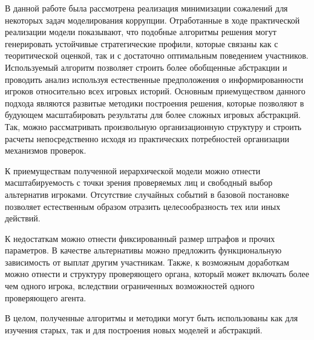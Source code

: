 \Conclusion %
\par
В данной работе была рассмотрена реализация минимизации сожалений для некоторых задач моделирования коррупции. Отработанные в ходе практической реализации модели показывают, что подобные алгоритмы решения могут генерировать устойчивые стратегические профили, которые связаны как с теоритической оценкой, так и с достаточно оптимальным поведением участников. Используемый алгоритм позволяет строить более обобщенные абстракции и проводить анализ используя естественные предположения о информированности игроков относительно всех игровых историй. Основным приемуществом данного подхода являются развитые методики построения решения, которые позволяют в будующем масштабировать результаты для более сложных игровых абстракций. Так, можно	рассматривать произвольную организационную структуру и строить расчеты непосредственно исходя из практических потребностей организации механизмов проверок.
\par
К приемуществам полученной иерархической модели можно отнести масштабируемость с точки зрения проверяемых лиц и свободный выбор альтернатив игроками. Отсутствие случайных событий в базовой постановке позволяет естественным образом отразить целесообразность тех или иных действий. 
\par
К недостаткам можно отнести фиксированный размер штрафов и прочих параметров. В качестве альтернативы можно предложить функциональную зависимость от выплат другим участникам. Также, к возможным доработкам можно отнести и структуру проверяющего органа, который может включать более чем одного игрока, вследствии ограниченных возможностей одного проверяющего агента.
\par 
В целом, полученные алгоритмы и методики могут быть использованы как для изучения старых, так и для построения новых моделей и абстракций. 
